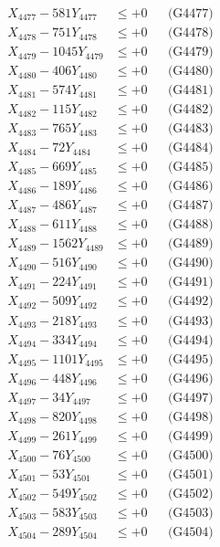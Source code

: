 \documentclass[a4paper,10pt]{article}
\begin{document}
{\begin{align}
X_{4477} - 581Y_{4477} &\leq +0 && \text{(G4477)} \\
X_{4478} - 751Y_{4478} &\leq +0 && \text{(G4478)} \\
X_{4479} - 1045Y_{4479} &\leq +0 && \text{(G4479)} \\
X_{4480} - 406Y_{4480} &\leq +0 && \text{(G4480)} \\
\allowbreak
X_{4481} - 574Y_{4481} &\leq +0 && \text{(G4481)} \\
X_{4482} - 115Y_{4482} &\leq +0 && \text{(G4482)} \\
X_{4483} - 765Y_{4483} &\leq +0 && \text{(G4483)} \\
X_{4484} - 72Y_{4484} &\leq +0 && \text{(G4484)} \\
X_{4485} - 669Y_{4485} &\leq +0 && \text{(G4485)} \\
X_{4486} - 189Y_{4486} &\leq +0 && \text{(G4486)} \\
X_{4487} - 486Y_{4487} &\leq +0 && \text{(G4487)} \\
X_{4488} - 611Y_{4488} &\leq +0 && \text{(G4488)} \\
X_{4489} - 1562Y_{4489} &\leq +0 && \text{(G4489)} \\
X_{4490} - 516Y_{4490} &\leq +0 && \text{(G4490)} \\
\allowbreak
X_{4491} - 224Y_{4491} &\leq +0 && \text{(G4491)} \\
X_{4492} - 509Y_{4492} &\leq +0 && \text{(G4492)} \\
X_{4493} - 218Y_{4493} &\leq +0 && \text{(G4493)} \\
X_{4494} - 334Y_{4494} &\leq +0 && \text{(G4494)} \\
X_{4495} - 1101Y_{4495} &\leq +0 && \text{(G4495)} \\
X_{4496} - 448Y_{4496} &\leq +0 && \text{(G4496)} \\
X_{4497} - 34Y_{4497} &\leq +0 && \text{(G4497)} \\
X_{4498} - 820Y_{4498} &\leq +0 && \text{(G4498)} \\
X_{4499} - 261Y_{4499} &\leq +0 && \text{(G4499)} \\
X_{4500} - 76Y_{4500} &\leq +0 && \text{(G4500)} \\
\allowbreak
X_{4501} - 53Y_{4501} &\leq +0 && \text{(G4501)} \\
X_{4502} - 549Y_{4502} &\leq +0 && \text{(G4502)} \\
X_{4503} - 583Y_{4503} &\leq +0 && \text{(G4503)} \\
X_{4504} - 289Y_{4504} &\leq +0 && \text{(G4504)} \\

\end{align}}
\end{document}
